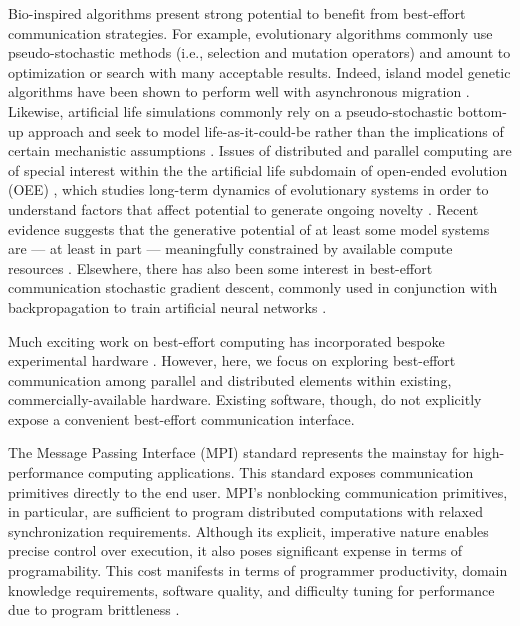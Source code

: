 Bio-inspired algorithms present strong potential to benefit from best-effort communication strategies.
For example, evolutionary algorithms commonly use pseudo-stochastic methods (i.e., selection and mutation operators) and amount to optimization or search with many acceptable results.
Indeed, island model genetic algorithms have been shown to perform well with asynchronous migration \cite{izzo2009parallel}.
Likewise, artificial life simulations commonly rely on a pseudo-stochastic bottom-up approach and seek to model life-as-it-could-be rather than the implications of certain mechanistic assumptions \cite{bonabeau1994we}.
Issues of distributed and parallel computing are of special interest within the the artificial life subdomain of open-ended evolution (OEE) \cite{ackley2014indefinitely}, which studies long-term dynamics of evolutionary systems in order to understand factors that affect potential to generate ongoing novelty \cite{taylor2016open}.
Recent evidence suggests that the generative potential of at least some model systems are --- at least in part --- meaningfully constrained by available compute resources \cite{channon2019maximum}.
Elsewhere, there has also been some interest in best-effort communication stochastic gradient descent, commonly used in conjunction with backpropagation to train artificial neural networks \cite{niu2011hogwild,noel2014dogwild}.

Much exciting work on best-effort computing has incorporated bespoke experimental hardware \cite{chippa2014scalable, ackley2011homeostatic, cho2012ersa, chakrapani2008probabilistic}.
However, here, we focus on exploring best-effort communication among parallel and distributed elements within existing, commercially-available hardware.
Existing software, though, do not explicitly expose a convenient best-effort communication interface.

The Message Passing Interface (MPI) standard \cite{gropp1996high} represents the mainstay for high-performance computing applications.
This standard exposes communication primitives directly to the end user.
MPI's nonblocking communication primitives, in particular, are sufficient to program distributed computations with relaxed synchronization requirements.
Although its explicit, imperative nature enables precise control over execution, it also poses significant expense in terms of programability.
This cost manifests in terms of programmer productivity, domain knowledge requirements, software quality, and difficulty tuning for performance due to program brittleness \cite{gu2019comparative, tang2014mpi}.

